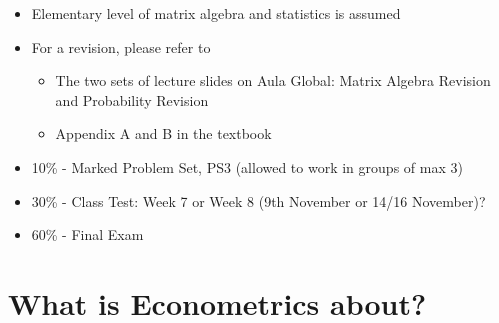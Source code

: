 \documentclass[notes=show]{beamer}
\begin{document}
\begin{frame}%


\begin{itemize}
\item Elementary level of matrix algebra and statistics is assumed

\item For a revision, please refer to 

\begin{itemize}
\item The two sets of lecture slides on Aula Global: Matrix Algebra Revision
and Probability Revision 

\item Appendix A and B in the textbook
\end{itemize}
\end{itemize}

\end{frame}%

\begin{frame}%


\begin{itemize}
\item 10\% - Marked Problem Set, PS3 (allowed to work in groups of max 3)

\item 30\% - Class Test: Week 7 or Week 8 (9th November or 14/16 November)?

\item 60\% - Final Exam
\end{itemize}

\end{frame}%

\section{What is Econometrics about?}
\end{document}
